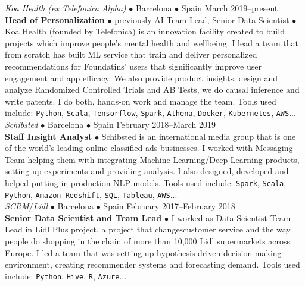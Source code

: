 \documentclass[a4paper, oneside]{scrreprt}
\begin{document}
\noindent{}
\hspace{-0.2cm}\textit{Koa Health (ex Telefonica Alpha)} $\bullet$
Barcelona $\bullet$ Spain \hfill March 2019--present\\
\noindent\textbf{\small Head of Personalization} $\bullet$ {previously AI Team Lead, Senior Data Scientist} $\bullet$ 
{\small Koa Health (founded by Telefonica) is an innovation facility created to build projects which improve people's mental health and wellbeing.  I lead a team that from scratch has built ML service that train and deliver personalized recommendations for Foundatins' users that significantly improve user engagement and app efficacy.  We also provide product insights, design and analyze Randomized Controlled Trials and AB Tests, we do causal inference and write patents. I do both, hands-on work and manage the team.  Tools used include: \texttt{Python}, \texttt{Scala}, \texttt{Tensorflow}, \texttt{Spark}, \texttt{Athena},
 \texttt{Docker}, \texttt{Kubernetes}, \texttt{AWS}... }\\

\vspace{-0.3cm}
\noindent{}
\hspace{-0.15cm}\textit{Schibsted} $\bullet$ 
Barcelona $\bullet$ Spain \hfill February 2018--March 2019\\
\noindent\textbf{\small Staff Insight Analyst } $\bullet$ 
{\small Schibsted is an international media group that is one of the world’s leading online
  classified ads businesses.  I worked with Messaging Team helping them with integrating Machine
  Learning/Deep Learning products, setting up experiments and providing analysis. I also designed,
  developed and helped putting in production NLP models. Tools used include: \texttt{Spark},
  \texttt{Scala}, \texttt{Python}, \texttt{Amazon Redshift}, \texttt{SQL}, \texttt{Tableau}, \texttt{AWS}... }\\

\vspace{-0.3cm}
\noindent{}\textit{SCRM}/\textit{Lidl} $\bullet$ 
Barcelona $\bullet$ Spain \hfill February 2017--February 2018\\
\noindent\textbf{\small Senior Data Scientist and Team Lead} $\bullet$ 
{\small I worked as Data Scientist Team Lead in Lidl Plus project, a project that changescustomer
  service and the way people do shopping in the chain of more than 10,000 Lidl supermarkets across
  Europe. I led a team that was setting up hypothesis-driven decision-making environment, creating
  recommender systems and forecasting demand. Tools used include: \texttt{Python}, \texttt{Hive},
  \texttt{R}, \texttt{Azure}...}\\
\end{document}
